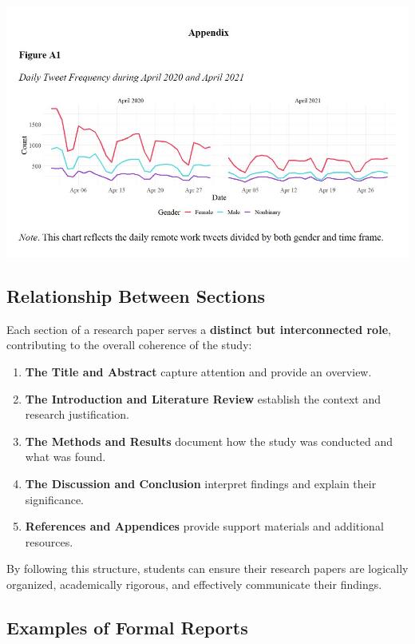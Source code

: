 \documentclass[
]{book}
\providecommand{\tightlist}{%
  \setlength{\itemsep}{0pt}\setlength{\parskip}{0pt}}
\begin{document}
\includegraphics[width=1\linewidth,height=\textheight,keepaspectratio]{images/fig086.jpg}

\subsection*{Relationship Between Sections}\label{relationship-between-sections}

Each section of a research paper serves a \textbf{distinct but interconnected role}, contributing to the overall coherence of the study:

\begin{enumerate}
\def\labelenumi{\arabic{enumi}.}
\tightlist
\item
  \textbf{The Title and Abstract} capture attention and provide an overview.
\item
  \textbf{The Introduction and Literature Review} establish the context and research justification.
\item
  \textbf{The Methods and Results} document how the study was conducted and what was found.
\item
  \textbf{The Discussion and Conclusion} interpret findings and explain their significance.
\item
  \textbf{References and Appendices} provide support materials and additional resources.
\end{enumerate}

By following this structure, students can ensure their research papers are logically organized, academically rigorous, and effectively communicate their findings.

\subsection*{Examples of Formal Reports}\label{examples-of-formal-reports}
\end{document}
